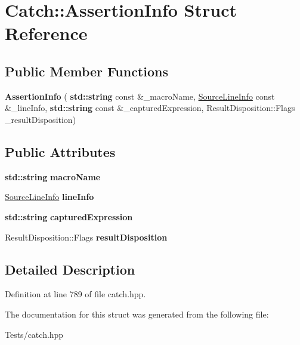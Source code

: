 \hypertarget{struct_catch_1_1_assertion_info}{}\section{Catch\+:\+:Assertion\+Info Struct Reference}
\label{struct_catch_1_1_assertion_info}
\subsection*{Public Member Functions}
\begin{DoxyCompactItemize}
\item 
\mbox{\label{struct_catch_1_1_assertion_info_aaf6cc3eebd40391e54d37ed42953c73f}} 
{\bfseries Assertion\+Info} (\textbf{ std\+::string} const \&\+\_\+macro\+Name, \hyperlink{struct_catch_1_1_source_line_info}{Source\+Line\+Info} const \&\+\_\+line\+Info, \textbf{ std\+::string} const \&\+\_\+captured\+Expression, Result\+Disposition\+::\+Flags \+\_\+result\+Disposition)
\end{DoxyCompactItemize}
\subsection*{Public Attributes}
\begin{DoxyCompactItemize}
\item 
\mbox{\label{struct_catch_1_1_assertion_info_ac2e59e8c89e00eb3390768f50d540b18}} 
\textbf{ std\+::string} {\bfseries macro\+Name}
\item 
\mbox{\label{struct_catch_1_1_assertion_info_a17bdbb404ba12658034f833be2f4c3e7}} 
\hyperlink{struct_catch_1_1_source_line_info}{Source\+Line\+Info} {\bfseries line\+Info}
\item 
\mbox{\label{struct_catch_1_1_assertion_info_af7c1d3cbfa346e9a303030fa0ef0cb54}} 
\textbf{ std\+::string} {\bfseries captured\+Expression}
\item 
\mbox{\label{struct_catch_1_1_assertion_info_a60353b3632ab2f827162f2b2d6911073}} 
Result\+Disposition\+::\+Flags {\bfseries result\+Disposition}
\end{DoxyCompactItemize}


\subsection{Detailed Description}


Definition at line 789 of file catch.\+hpp.



The documentation for this struct was generated from the following file\+:\begin{DoxyCompactItemize}
\item 
Tests/catch.\+hpp\end{DoxyCompactItemize}
